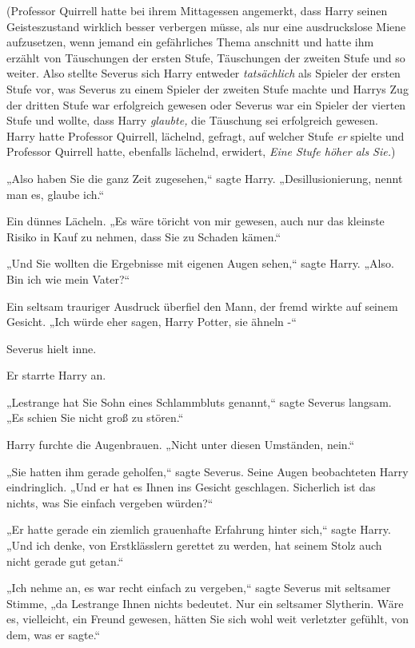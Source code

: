 {(Professor Quirrell hatte bei ihrem Mittagessen angemerkt, dass Harry seinen Geisteszustand wirklich besser verbergen müsse, als nur eine ausdruckslose Miene aufzusetzen, wenn jemand ein gefährliches Thema anschnitt und hatte ihm erzählt von Täuschungen der ersten Stufe, Täuschungen der zweiten Stufe und so weiter. Also stellte Severus sich Harry entweder \emph{tatsächlich} als Spieler der ersten Stufe vor, was Severus zu einem Spieler der zweiten Stufe machte und Harrys Zug der dritten Stufe war erfolgreich gewesen oder Severus war ein Spieler der vierten Stufe und wollte, dass Harry \emph{glaubte,} die Täuschung sei erfolgreich gewesen. Harry hatte Professor Quirrell, lächelnd, gefragt, auf welcher Stufe \emph{er} spielte und Professor Quirrell hatte, ebenfalls lächelnd, erwidert, \emph{Eine Stufe höher als Sie.})

„Also haben Sie die ganz Zeit zugesehen,“ sagte Harry. „Desillusionierung, nennt man es, glaube ich.“

Ein dünnes Lächeln. „Es wäre töricht von mir gewesen, auch nur das kleinste Risiko in Kauf zu nehmen, dass Sie zu Schaden kämen.“

„Und Sie wollten die Ergebnisse mit eigenen Augen sehen,“ sagte Harry. „Also. Bin ich wie mein Vater?“

Ein seltsam trauriger Ausdruck überfiel den Mann, der fremd wirkte auf seinem Gesicht. „Ich würde eher sagen, Harry Potter, sie ähneln -“

Severus hielt inne.

Er starrte Harry an.

„Lestrange hat Sie Sohn eines Schlammbluts genannt,“ sagte Severus langsam. „Es schien Sie nicht groß zu stören.“

Harry furchte die Augenbrauen. „Nicht unter diesen Umständen, nein.“

„Sie hatten ihm gerade geholfen,“ sagte Severus. Seine Augen beobachteten Harry eindringlich. „Und er hat es Ihnen ins Gesicht geschlagen. Sicherlich ist das nichts, was Sie einfach vergeben würden?“

„Er hatte gerade ein ziemlich grauenhafte Erfahrung hinter sich,“ sagte Harry. „Und ich denke, von Erstklässlern gerettet zu werden, hat seinem Stolz auch nicht gerade gut getan.“

„Ich nehme an, es war recht einfach zu vergeben,“ sagte Severus mit seltsamer Stimme, „da Lestrange Ihnen nichts bedeutet. Nur ein seltsamer Slytherin. Wäre es, vielleicht, ein Freund gewesen, hätten Sie sich wohl weit verletzter gefühlt, von dem, was er sagte.“

}
